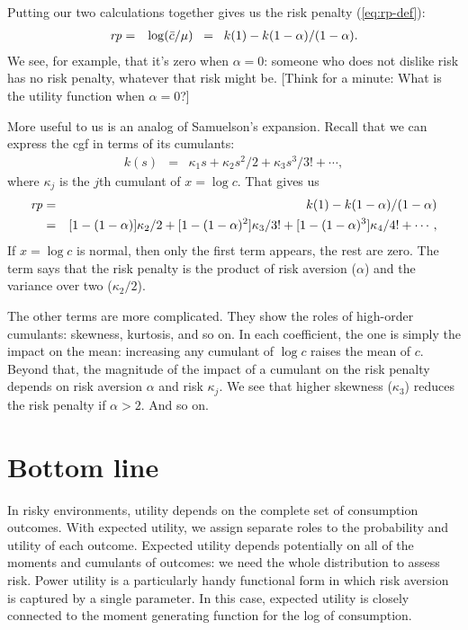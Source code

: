 \documentclass[11pt]{article}
\begin{document}
Putting our two calculations together gives us the risk penalty (\ref{eq:rp-def}):
\begin{eqnarray*}
    \mbox{\em rp\/} &=& \log (\bar{c}/\mu)  \;\;=\;\; k(1) -  k(1-\alpha) / (1-\alpha) .
\end{eqnarray*}
We see, for example, that it's zero when $\alpha = 0$:
someone who does not dislike risk has no risk penalty,
whatever that risk might be.
[Think for a minute:  What is the utility function when $\alpha = 0$?]

More useful to us is an analog of Samuelson's expansion.
Recall that we can express the cgf in terms of its cumulants:
\begin{eqnarray*}
    k(s) &=& \kappa_1 s + \kappa_2 s^2/2 + \kappa_3 s^3/3! + \cdots ,
\end{eqnarray*}
where $\kappa_j$ is the $j$th cumulant of $x = \log c$.
That gives us
\begin{eqnarray}
    \mbox{\em rp\/} &=& k(1) -  k(1-\alpha)/(1-\alpha) \nonumber \\
        &=& [1-(1-\alpha)] \kappa_2/2 + [1- (1-\alpha)^2] \kappa_3/3!
            + [1- (1-\alpha)^3] \kappa_4/4! + \cdots ,
        \label{eq:rp-cum-expansion}
\end{eqnarray}
If $x = \log c$ is normal, then only the first term appears,
the rest are zero.
The term says that the risk penalty is the product of risk aversion ($\alpha$)
and the variance over two ($\kappa_2/2$).

The other terms are more complicated.
They show the roles of high-order cumulants:  skewness, kurtosis, and so on.
In each coefficient, the one is simply the impact on the mean:
increasing any cumulant of $\log c$ raises the mean of $c$.
Beyond that, the magnitude of the impact of a cumulant
on the risk penalty depends on risk aversion $\alpha$ and risk $\kappa_j$.
We see that higher skewness ($\kappa_3$) reduces the risk penalty if $\alpha > 2$.
And so on.


\section*{Bottom line}

In risky environments, utility depends
on the complete set of consumption outcomes.
With expected utility, we assign separate roles to the probability
and utility of each outcome.
Expected utility depends potentially on all of the moments and cumulants
of outcomes:
we need the whole distribution to assess risk.
Power utility is a particularly handy functional form
in which risk aversion is captured by a single parameter.
In this case, expected utility is closely connected to the
moment generating function for the log of consumption.
\end{document}
